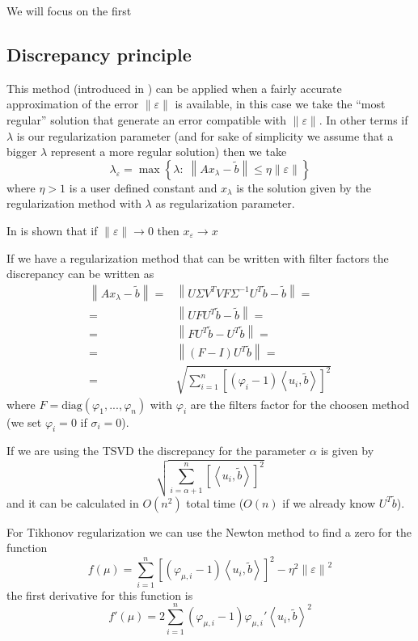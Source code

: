 \documentclass[a4paper,10pt]{article}
\theoremstyle{plain}
\theoremstyle{definition}
\theoremstyle{remark}
\newcommand{\set}[1]{\left\{#1\right\}}
\newcommand{\pa}[1]{\left(#1\right)}
\newcommand{\ang}[1]{\left<#1\right>}
\newcommand{\bra}[1]{\left[#1\right]}
\newcommand{\norm}[1]{\left\|#1\right\|}
\begin{document}
We will focus on the first

\subsection{Discrepancy principle}

This method (introduced in \cite{discreporig}) can be applied when a
fairly accurate approximation of the error $\norm{\varepsilon}$ is
available, in this case we take the ``most regular'' solution that
generate an error compatible with $\norm{\varepsilon}$. In other terms
if $\lambda$ is our regularization parameter (and for sake of
simplicity we assume that a bigger $\lambda$ represent a more regular
solution) then we take
\begin{equation}
  \label{eq:discrepancygen}
  \lambda _\varepsilon = \max \set { \lambda :\; \norm{ Ax_\lambda -
      \tilde b} \le \eta \norm{\varepsilon}} 
\end{equation}
where $\eta > 1$ is a user defined constant and $x_\lambda$ is the
solution given by the regularization method with $\lambda$ as
regularization parameter.

In \cite{discrepbook} is shown that if $\norm{\varepsilon} \to 0$ then
$x _\varepsilon \to x$

If we have a regularization method that can be written with filter
factors the discrepancy can be written as
\begin{align*}
  \norm{ Ax_\lambda - \tilde b } =& \norm{ U \Sigma V^T V F \Sigma
    ^{-1} U^T \tilde b - \tilde b} =\\
  =& \norm { U F U^T \tilde b - \tilde b} =\\
  = & \norm{ F U^T \tilde b - U^T \tilde b } =\\
  =& \norm{ \pa{F-I} U^T \tilde b} =\\
  =& \sqrt{\sum _{i=1} ^n \bra{ \pa{ \varphi _i -1} \ang{ u_i, \tilde b} } ^2}
\end{align*}
where $F = \mathrm{diag}\pa{ \varphi _1 ,... , \varphi _n}$ with
$\varphi _i$ are the filters factor for the choosen method (we set
$\varphi _i = 0$ if $\sigma _i = 0$).

If we are using the TSVD the discrepancy for the parameter $\alpha$ is
given by
\[ \sqrt{\sum _{i=\alpha +1} ^n \bra{ \ang{ u_i, \tilde b} } ^2 } \]
and it can be calculated in $O(n^2)$ total time ($O(n)$ if we already
know $U^T \tilde b$).

For Tikhonov regularization we can use the Newton method to find a
zero for the function
\[ f(\mu) = \sum _{i=1} ^n \bra{ \pa{ \varphi _{\mu,i} -1} \ang{ u_i,
    \tilde b} } ^2 - \eta ^2 \norm{\varepsilon} ^2 \] 
the first derivative for this function is
\[ f'(\mu) = 2 \sum _{i=1} ^n \pa{ \varphi _{\mu,i} -1} \varphi
_{\mu,i} ' \ang{ u_i, \tilde b} ^2 \]



\newpage


\end{document}
